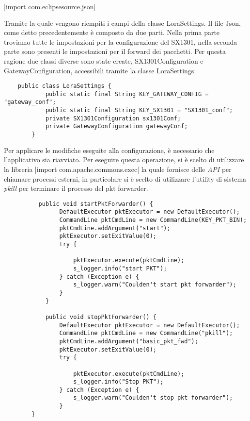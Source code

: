 |import com.eclipsesource.json|

Tramite la quale vengono riempiti i campi della classe LoraSettings. Il file
Json, come detto precedentemente è composto da due parti. Nella prima parte
troviamo tutte le impostazioni per la configurazione del SX1301, nella seconda
parte sono presenti le impostazioni per il forward dei pacchetti. Per questa
ragione due classi diverse sono state create, SX1301Configuration e
GatewayConfiguration, accessibili tramite la classe LoraSettings.

\begin{verbatim}
    public class LoraSettings {
            public static final String KEY_GATEWAY_CONFIG = "gateway_conf";
            public static final String KEY_SX1301 = "SX1301_conf";
            private SX1301Configuration sx1301Conf;
            private GatewayConfiguration gatewayConf;
        }
\end{verbatim}

Per applicare le modifiche eseguite alla configurazione, è necessario che
l'applicativo sia riavviato. Per eseguire questa operazione, si è scelto di
utilizzare la libreria 
|import com.apache.commons.exec|
la quale fornisce delle \emph{API} per chiamare processi esterni, in particolare
si è scelto di utilizzare l'utility di sistema \emph{pkill} per terminare il
processo del pkt forwarder.
\begin{verbatim}
          public void startPktForwarder() {
                DefaultExecutor pktExecutor = new DefaultExecutor();
                CommandLine pktCmdLine = new CommandLine(KEY_PKT_BIN);
                pktCmdLine.addArgument("start");
                pktExecutor.setExitValue(0);
                try {

                    pktExecutor.execute(pktCmdLine);
                    s_logger.info("start PKT");
                } catch (Exception e) {
                    s_logger.warn("Coulden't start pkt forwarder");
                }
            }

            public void stopPktForwarder() {
                DefaultExecutor pktExecutor = new DefaultExecutor();
                CommandLine pktCmdLine = new CommandLine("pkill");
                pktCmdLine.addArgument("basic_pkt_fwd");
                pktExecutor.setExitValue(0);
                try {

                    pktExecutor.execute(pktCmdLine);
                    s_logger.info("Stop PKT");
                } catch (Exception e) {
                    s_logger.warn("Coulden't stop pkt forwarder");
                }
        }

\end{verbatim}

